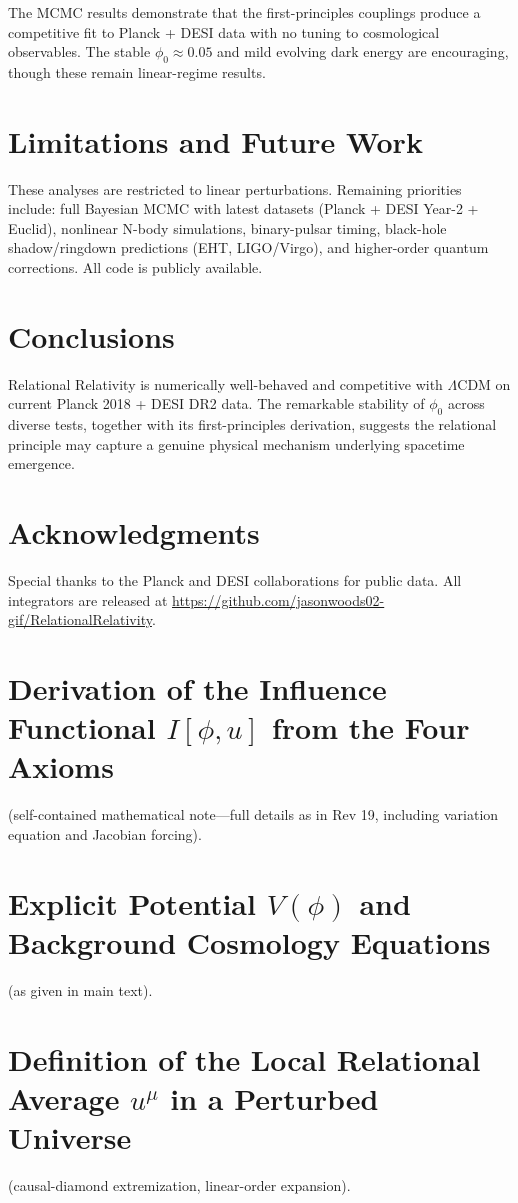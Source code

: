 \documentclass[11pt,a4paper]{article}
\begin{document}
The MCMC results demonstrate that the first-principles couplings produce a competitive fit to Planck + DESI data with no tuning to cosmological observables. The stable $\phi_0 \approx 0.05$ and mild evolving dark energy are encouraging, though these remain linear-regime results.

\section{Limitations and Future Work}
These analyses are restricted to linear perturbations. Remaining priorities include: full Bayesian MCMC with latest datasets (Planck + DESI Year-2 + Euclid), nonlinear N-body simulations, binary-pulsar timing, black-hole shadow/ringdown predictions (EHT, LIGO/Virgo), and higher-order quantum corrections. All code is publicly available.

\section{Conclusions}
Relational Relativity is numerically well-behaved and competitive with $\Lambda$CDM on current Planck 2018 + DESI DR2 data. The remarkable stability of $\phi_0$ across diverse tests, together with its first-principles derivation, suggests the relational principle may capture a genuine physical mechanism underlying spacetime emergence.

\section*{Acknowledgments}
Special thanks to the Planck and DESI collaborations for public data. All integrators are released at \url{https://github.com/jasonwoods02-gif/RelationalRelativity}.

\appendix
\section{Derivation of the Influence Functional $I[\phi, u]$ from the Four Axioms}
(self-contained mathematical note---full details as in Rev 19, including variation equation and Jacobian forcing).

\section{Explicit Potential $V(\phi)$ and Background Cosmology Equations}
(as given in main text).

\section{Definition of the Local Relational Average $u^\mu$ in a Perturbed Universe}
(causal-diamond extremization, linear-order expansion).
\end{document}
